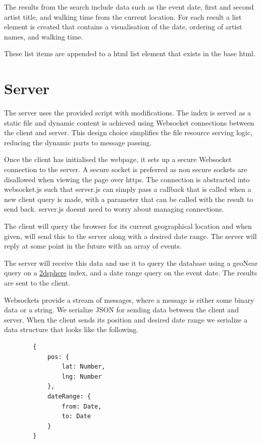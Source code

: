 \documentclass[10pt]{article}
\begin{document}
            The results from the search include data such as the event date, first and second artist title, and walking time from the current location. For each result a list element is created that contains a visualisation of the date, ordering of artist names, and walking time.

            These list items are appended to a html list element that exists in the base html.

    \section{Server}
        The server uses the provided script with modifications. The index is served as a static file and dynamic content is achieved using Websocket connections between the client and server. This design choice simplifies the file resource serving logic, reducing the dynamic parts to message passing.

        Once the client has initialised the webpage, it sets up a secure Websocket connection to the server. A secure socket is preferred as non secure sockets are disallowed when viewing the page over https. The connection is abstracted into websocket.js such that server.js can simply pass a callback that is called when a new client query is made, with a parameter that can be called with the result to send back. server.js doesnt need to worry about managing connections.

        The client will query the browser for its current geographical location and when given, will send this to the server along with a desired date range. The server will reply at some point in the future with an array of events.

        The server will receive this data and use it to query the database using a geoNear query on a \href{https://docs.mongodb.com/manual/core/2dsphere/}{2dsphere} index, and a date range query on the event date. The results are sent to the client.

        Websockets provide a stream of messages, where a message is either some binary data or a string. We serialize JSON for sending data between the client and server. When the client sends its position and desired date range we serialize a data structure that looks like the following.

        \begin{verbatim}
        {
            pos: {
                lat: Number,
                lng: Number
            },
            dateRange: {
                from: Date,
                to: Date
            }
        }
        \end{verbatim}
\end{document}
